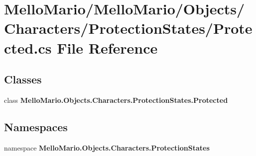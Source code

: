 \section{Mello\+Mario/\+Mello\+Mario/\+Objects/\+Characters/\+Protection\+States/\+Protected.cs File Reference}
\label{Protected_8cs}
\subsection*{Classes}
\begin{DoxyCompactItemize}
\item 
class \textbf{ Mello\+Mario.\+Objects.\+Characters.\+Protection\+States.\+Protected}
\end{DoxyCompactItemize}
\subsection*{Namespaces}
\begin{DoxyCompactItemize}
\item 
namespace \textbf{ Mello\+Mario.\+Objects.\+Characters.\+Protection\+States}
\end{DoxyCompactItemize}
